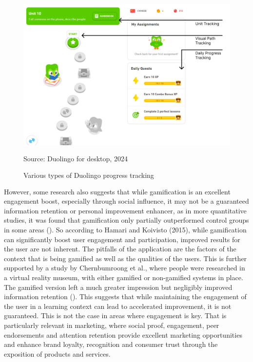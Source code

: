 \begin{figure}[htbp]
 \centering
 \includegraphics[width=14cm]{Media/DuolingoProgress.png}
 \caption{Various types of Duolingo progress tracking}
 \label{fig:duolingoProgress}
  {\raggedright \small{Source: Duolingo for desktop, 2024}\par}
\end{figure}

However, some research also suggests that while gamification is an excellent engagement boost, especially through social influence, it may not be a guaranteed information retention or personal improvement enhancer, as in more quantitative studies, it was found that gamification only partially outperformed control groups in some areas (\cite{doesItWork}). 
So according to Hamari and Koivisto (2015), while gamification can significantly boost user engagement and participation, improved results for the user are not inherent. 
The pitfalls of the application are the factors of the context that is being gamified as well as the qualities of the users. 
This is further supported by a study by Chernbumroong et al., where people were researched in a virtual reality museum, with either gamified or non-gamified systems in place. 
The gamified version left a much greater impression but negligibly improved information retention (\cite{VR}). 
This suggests that while maintaining the engagement of the user in a learning context can lead to accelerated improvement, it is not guaranteed. 
This is not the case in areas where engagement is key. 
That is particularly relevant in marketing, where social proof, engagement, peer endorsements and attention retention provide excellent marketing opportunities and enhance brand loyalty, recognition and consumer trust through the exposition of products and services.

